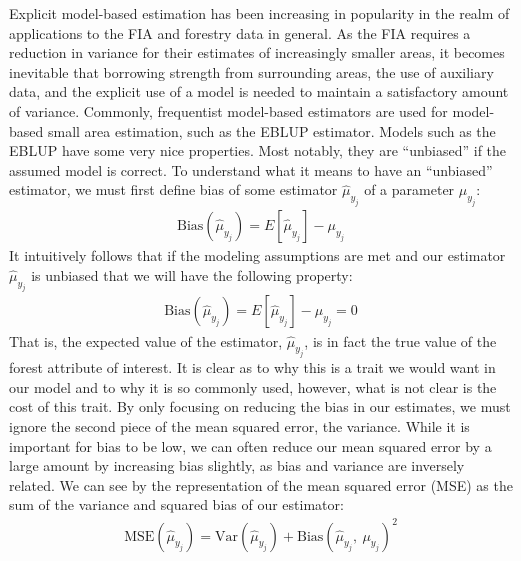 \documentclass[12pt,twoside]{reedthesis}
\begin{document}
Explicit model-based estimation has been increasing in popularity in the realm of applications to the FIA and forestry data in general. As the FIA requires a reduction in variance for their estimates of increasingly smaller areas, it becomes inevitable that borrowing strength from surrounding areas, the use of auxiliary data, and the explicit use of a model is needed to maintain a satisfactory amount of variance. Commonly, frequentist model-based estimators are used for model-based small area estimation, such as the EBLUP estimator. Models such as the EBLUP have some very nice properties. Most notably, they are ``unbiased'' if the assumed model is correct. To understand what it means to have an ``unbiased'' estimator, we must first define bias of some estimator \(\hat\mu_{y_j}\) of a parameter \(\mu_{y_j}\):
\begin{align}
\text{Bias}(\hat\mu_{y_j}) = E[\hat\mu_{y_j}] - \mu_{y_j}
\end{align}
It intuitively follows that if the modeling assumptions are met and our estimator \(\hat\mu_{y_j}\) is unbiased that we will have the following property:
\begin{align}
\text{Bias}(\hat\mu_{y_j}) = E[\hat\mu_{y_j}] - \mu_{y_j} = 0
\end{align}
That is, the expected value of the estimator, \(\hat\mu_{y_j}\), is in fact the true value of the forest attribute of interest. It is clear as to why this is a trait we would want in our model and to why it is so commonly used, however, what is not clear is the cost of this trait. By only focusing on reducing the bias in our estimates, we must ignore the second piece of the mean squared error, the variance. While it is important for bias to be low, we can often reduce our mean squared error by a large amount by increasing bias slightly, as bias and variance are inversely related. We can see by the representation of the mean squared error (MSE) as the sum of the variance and squared bias of our estimator:
\begin{align}
\text{MSE}(\hat\mu_{y_j}) = \text{Var}(\hat\mu_{y_j}) + \text{Bias}(\hat\mu_{y_j},~ \mu_{y_j})^2
\end{align}
\end{document}
